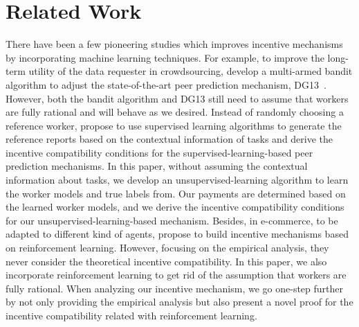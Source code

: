 \section{Related Work}
There have been a few pioneering studies which improves incentive mechanisms by incorporating machine learning techniques.
For example, to improve the long-term utility of the data requester in crowdsourcing, \citet{liu2017sequential} develop a multi-armed bandit algorithm to adjust the state-of-the-art peer prediction mechanism, DG13~\cite{dasgupta2013crowdsourced}.
However, both the bandit algorithm and DG13 still need to assume that workers are fully rational and will behave as we desired.
Instead of randomly choosing a reference worker, \citet{liu2017machine} propose to use supervised learning algorithms to generate the reference reports based on the contextual information of tasks and derive the incentive compatibility conditions for the supervised-learning-based peer prediction mechanisms.
In this paper, without assuming the contextual information about tasks, we develop an unsupervised-learning algorithm to learn the worker models and true labels from.
Our payments are determined based on the learned worker models, and we derive the incentive compatibility conditions for our unsupervised-learning-based mechanism.
Besides, in e-commerce, to be adapted to different kind of agents, \citet{RMDE,cai2018reinforcement} propose to build incentive mechanisms based on reinforcement learning.
However, focusing on the empirical analysis, they never consider the theoretical incentive compatibility.
In this paper, we also incorporate reinforcement learning to get rid of the assumption that workers are fully rational.
When analyzing our incentive mechanism, we go one-step further by not only providing the empirical analysis but also present a novel proof for the incentive compatibility related with reinforcement learning.


